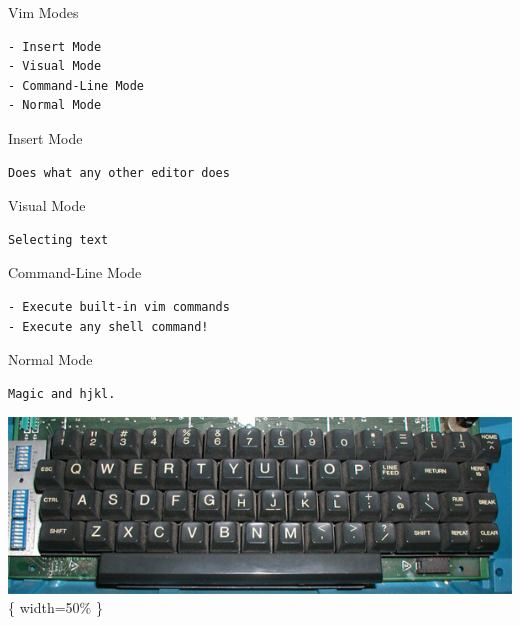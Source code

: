 \documentclass[aspectratio=169,12pt]{beamer}
\begin{document}
\begin{frame}[fragile]{Vim Modes}

\begin{verbatim}
- Insert Mode
- Visual Mode
- Command-Line Mode
- Normal Mode
\end{verbatim}

\end{frame}

\begin{frame}[fragile]{Insert Mode}

\begin{verbatim}
Does what any other editor does
\end{verbatim}

\end{frame}

\begin{frame}[fragile]{Visual Mode}

\begin{verbatim}
Selecting text
\end{verbatim}

\end{frame}

\begin{frame}[fragile]{Command-Line Mode}

\begin{verbatim}
- Execute built-in vim commands
- Execute any shell command!
\end{verbatim}

\end{frame}

\begin{frame}[fragile]{Normal Mode}

\begin{verbatim}
Magic and hjkl.
\end{verbatim}

\end{frame}

\begin{frame}{}

\includegraphics{resources/vim/hjkl_keyboard.jpg}\{ width=50\% \}

\end{frame}
\end{document}
